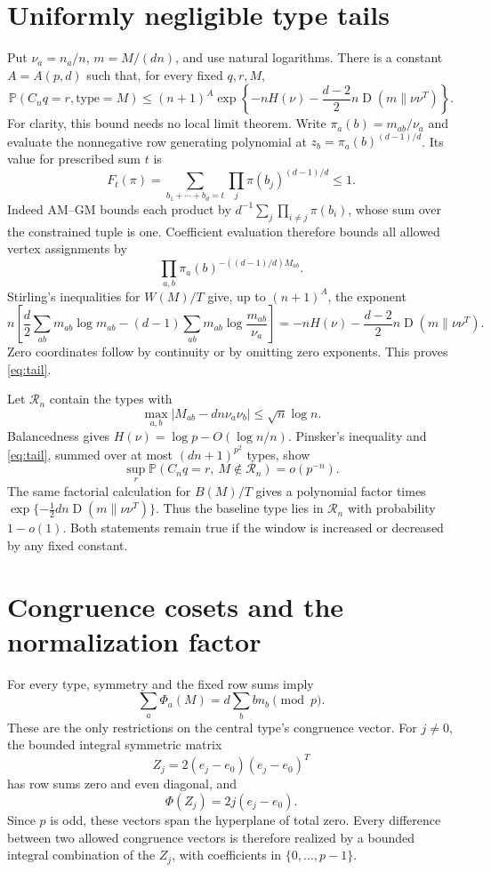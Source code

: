\documentclass[11pt]{article}
\newcommand{\Prob}{\mathbb P}
\newcommand{\KL}{\operatorname{D}}
\begin{document}
\section{Uniformly negligible type tails}
Put $\nu_a=n_a/n$, $m=M/(dn)$, and use natural logarithms. There is a
constant $A=A(p,d)$ such that, for every fixed $q,r,M$,
\begin{equation}\label{eq:tail}
 \Prob(C_nq=r,\text{type}=M)
 \le(n+1)^A\exp\left\{-nH(\nu)
       -\frac{d-2}{2}n\KL(m\|\nu\nu^T)\right\}.
\end{equation}
For clarity, this bound needs no local limit theorem. Write
$\pi_a(b)=m_{ab}/\nu_a$ and evaluate the nonnegative row generating
polynomial at $z_b=\pi_a(b)^{(d-1)/d}$. Its value for prescribed sum
$t$ is
\[
 F_t(\pi)=\sum_{b_1+\cdots+b_d=t}
               \prod_j\pi(b_j)^{(d-1)/d}\le1.
\]
Indeed AM--GM bounds each product by
$d^{-1}\sum_j\prod_{i\ne j}\pi(b_i)$, whose sum over the constrained
tuple is one. Coefficient evaluation therefore bounds all allowed
vertex assignments by
\[
 \prod_{a,b}\pi_a(b)^{-((d-1)/d)M_{ab}}.
\]
Stirling's inequalities for $W(M)/T$ give, up to $(n+1)^A$, the exponent
\[
 n\left[\frac d2\sum_{ab}m_{ab}\log m_{ab}
       -(d-1)\sum_{ab}m_{ab}\log\frac{m_{ab}}{\nu_a}\right]
 =-nH(\nu)-\frac{d-2}{2}n\KL(m\|\nu\nu^T).
\]
Zero coordinates follow by continuity or by omitting zero exponents.
This proves \eqref{eq:tail}.

Let $\mathcal R_n$ contain the types with
\[
 \max_{a,b}|M_{ab}-dn\nu_a\nu_b|\le\sqrt n\log n.
\]
Balancedness gives $H(\nu)=\log p-O(\log n/n)$. Pinsker's inequality
and \eqref{eq:tail}, summed over at most $(dn+1)^{p^2}$ types, show
\begin{equation}\label{eq:tailsmall}
 \sup_r\Prob(C_nq=r,\ M\notin\mathcal R_n)=o(p^{-n}).
\end{equation}
The same factorial calculation for $B(M)/T$ gives a polynomial factor
times $\exp\{-\tfrac12dn\KL(m\|\nu\nu^T)\}$. Thus the baseline type
lies in $\mathcal R_n$ with probability $1-o(1)$. Both statements remain
true if the window is increased or decreased by any fixed constant.

\section{Congruence cosets and the normalization factor}
For every type, symmetry and the fixed row sums imply
\[
 \sum_a\Phi_a(M)=d\sum_bbn_b\pmod p.
\]
These are the only restrictions on the central type's congruence vector.
For $j\ne0$, the bounded integral symmetric matrix
\[
 Z_j=2(e_j-e_0)(e_j-e_0)^T
\]
has row sums zero and even diagonal, and
\[
 \Phi(Z_j)=2j(e_j-e_0).
\]
Since $p$ is odd, these vectors span the hyperplane of total zero.
Every difference between two allowed congruence vectors is therefore
realized by a bounded integral combination of the $Z_j$, with
coefficients in $\{0,\ldots,p-1\}$.
\end{document}
